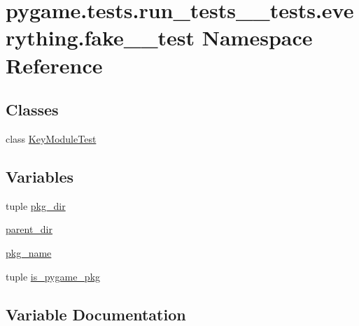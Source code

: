 \hypertarget{namespacepygame_1_1tests_1_1run__tests____tests_1_1everything_1_1fake__2__test}{}\section{pygame.\+tests.\+run\+\_\+tests\+\_\+\+\_\+tests.\+everything.\+fake\+\_\+\_\+test Namespace Reference}
\label{namespacepygame_1_1tests_1_1run__tests____tests_1_1everything_1_1fake__2__test}
\subsection*{Classes}
\begin{DoxyCompactItemize}
\item 
class \hyperlink{classpygame_1_1tests_1_1run__tests____tests_1_1everything_1_1fake__2__test_1_1_key_module_test}{Key\+Module\+Test}
\end{DoxyCompactItemize}
\subsection*{Variables}
\begin{DoxyCompactItemize}
\item 
tuple \hyperlink{namespacepygame_1_1tests_1_1run__tests____tests_1_1everything_1_1fake__2__test_a40eb167f0c042c3ef2dd5dd84ec932c1}{pkg\+\_\+dir}
\item 
\hyperlink{namespacepygame_1_1tests_1_1run__tests____tests_1_1everything_1_1fake__2__test_a0643a8816206466d757e928d32e75d0e}{parent\+\_\+dir}
\item 
\hyperlink{namespacepygame_1_1tests_1_1run__tests____tests_1_1everything_1_1fake__2__test_a8fb7c1116ee0d52c6c9f5111d55556dd}{pkg\+\_\+name}
\item 
tuple \hyperlink{namespacepygame_1_1tests_1_1run__tests____tests_1_1everything_1_1fake__2__test_a9795d7b3c37b44ccda049093af63d918}{is\+\_\+pygame\+\_\+pkg}
\end{DoxyCompactItemize}


\subsection{Variable Documentation}
\mbox{\label{namespacepygame_1_1tests_1_1run__tests____tests_1_1everything_1_1fake__2__test_a9795d7b3c37b44ccda049093af63d918}} 
